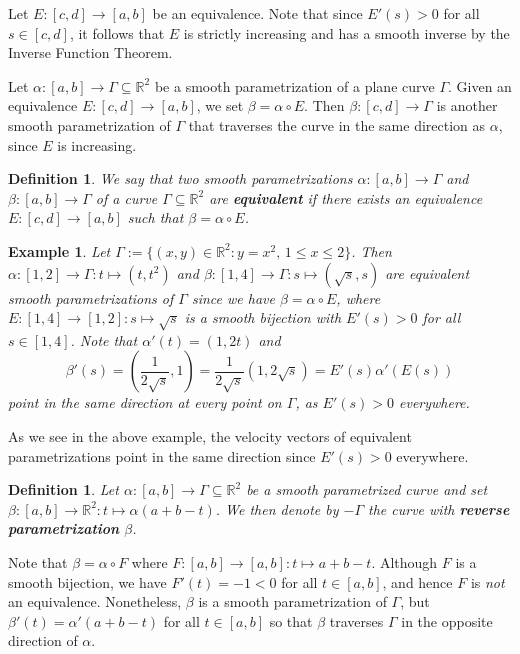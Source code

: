 \documentclass[10pt]{article}
\newcommand{\R}{\mathbb{R}}
\theoremstyle{newstyle}
\newtheorem{defn}[thm]{Definition}
\newtheorem{exmp}[thm]{Example}
\begin{document}
Let $E : [c, d] \to [a, b]$ be an equivalence. Note that since $E'(s) > 0$ for all $s \in [c, d]$, it
follows that $E$ is strictly increasing and has a smooth inverse by the Inverse Function Theorem. 

Let $\alpha : [a, b] \to \Gamma \subseteq \R^2$ be a smooth parametrization of a plane curve 
$\Gamma$. Given an equivalence $E : [c, d] \to [a, b]$, we set $\beta = \alpha \circ E$. 
Then $\beta : [c, d] \to \Gamma$ is another smooth parametrization of $\Gamma$ that traverses 
the curve in the same direction as $\alpha$, since $E$ is increasing.

\begin{defn}
We say that two smooth parametrizations $\alpha : [a, b] \to \Gamma$ and $\beta : [a, b] 
\to \Gamma$ of a curve $\Gamma \subseteq \R^2$ are {\bf equivalent} if there exists 
an equivalence $E : [c, d] \to [a, b]$ such that $\beta = \alpha \circ E$.
\end{defn}

\begin{exmp}
Let $\Gamma := \{(x, y) \in \R^2 : y = x^2,\, 1 \leq x \leq 2\}$. 
Then $\alpha : [1, 2] \to \Gamma : t \mapsto (t, t^2)$ and $\beta : [1, 4] \to \Gamma : 
s \mapsto (\sqrt{s}, s)$ are equivalent smooth parametrizations of $\Gamma$ since 
we have $\beta = \alpha \circ E$, where $E : [1, 4] \to [1, 2] : s \mapsto \sqrt{s}$ 
is a smooth bijection with $E'(s) > 0$ for all $s \in [1, 4]$. Note that 
$\alpha'(t) = (1, 2t)$ and 
\[ \beta'(s) = \left( \frac{1}{2\sqrt{s}}, 1 \right) = \frac{1}{2\sqrt{s}} (1, 2\sqrt{s}) 
= E'(s) \alpha'(E(s)) \] 
point in the same direction at every point on $\Gamma$, as $E'(s) > 0$ everywhere.
\end{exmp}

As we see in the above example, the velocity vectors of equivalent parametrizations point in the 
same direction since $E'(s) > 0$ everywhere.

\begin{defn}
Let $\alpha : [a, b] \to \Gamma \subseteq \R^2$ be a smooth parametrized curve and set $\beta : 
[a, b] \to \R^2 : t \mapsto \alpha(a+b-t)$. We then denote by $-\Gamma$ the curve with 
{\bf reverse parametrization} $\beta$.
\end{defn}

Note that $\beta = \alpha \circ F$ where $F : [a, b] \to [a, b] : t \mapsto a+b-t$. 
Although $F$ is a smooth bijection, we have $F'(t) = -1 < 0$ for all 
$t \in [a, b]$, and hence $F$ is {\it not} an equivalence. Nonetheless, $\beta$ is a 
smooth parametrization of $\Gamma$, but 
$\beta'(t) = \alpha'(a+b-t)$ for all $t \in [a, b]$ so that $\beta$ traverses 
$\Gamma$ in the opposite direction of $\alpha$.
\end{document}
